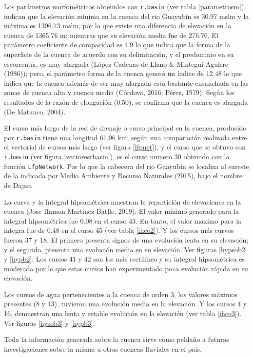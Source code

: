 \documentclass[11pt,]{article}
\begin{document}
Los parámetros morfométricos obtenidos con \texttt{r.basin} (ver tabla
\ref{parametrosm}), indican que la elevación mínima en la cuenca del rio
Guayubín es 30.97 mslm y la máxima es 1396.73 mslm, por lo que existe
una diferencia de elevación en la cuenca de 1365.76 m; mientras que su
elevación media fue de 276.70. El parámetro coeficiente de compacidad es
4.9 lo que indica que la forma de la superficie de la cuenca de acuerdo
con su delimitación, y el predominio en su escorrentía, es muy alargada
(López Cadenas de Llano \& Mintegui Aguirre (1986)); pero, el parámetro
forma de la cuenca generó un índice de 12.48 lo que indica que la cuenca
además de ser muy alargada está bastante ensanchada en las zonas de
cuenca alta y cuenca media (Córdova, 2016; Pérez, 1979). Según los
resultados de la razón de elongación (0.50), se confirma que la cuenca
es alargada (De Matauco, 2004).

El curso más largo de la red de drenaje o curso principal en la cuenca,
producido por \texttt{r.basin} tiene una longitud 61.96 km; según una
comparación realizada entre el vectorial de cursos más largo (ver figura
\ref{lfpnet}), y el curso que se obtuvo con \texttt{r.basin} (ver figura
\ref{vectoresrbasin}), es el curso numero 30 obtenido con la función
\texttt{LfpNetwork}. Por lo que la cabecera del rio Guayubín se localiza
al sureste de la indicada por Medio Ambiente y Recurso Naturales (2015),
bajo el nombre de Dajao.

La curva y la integral hipsométrica muestran la repartición de
elevaciones en la cuenca (Jose Ramon Martinez Batlle, 2019). El valor
mínimo generado para la integral hipsométrica fue 0.08 en el curso 43.
En tanto, el valor máximo para la integra fue de 0.48 en el curso 45
(ver tabla \ref{ihco2}). Y los cursos más curvos fueron 37 y 18. El
primero presenta signos de una evolución lenta en su elevación; y el
segundo, presenta una evolución media en su elevación. Ver figuras
\ref{hypsob2} y \ref{hypb2}. Los cursos 41 y 42 son los más rectilíneo y
su integral hipsométrica es moderada por lo que estos cursos han
experimentado poca evolución rápida en su elevación.

Los cursos de agua pertenecientes a la cuenca de orden 3, los valores
máximos presentes (8 y 13), tuvieron una evolución media en la
elevación. Y los cursos 4 y 16, demuestran una lenta y estable evolución
en la elevación (ver tabla \ref{ihco3}). Ver figuras \ref{hysob3} y
\ref{hypb3}.

Toda la información generada sobre la cuenca sirve como peldaño a
futuras investigaciones sobre la misma u otras cuencas fluviales en el
país.
\end{document}
